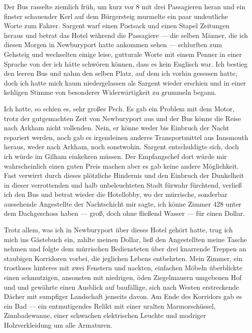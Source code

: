 Der Bus rasselte ziemlich früh, um kurz vor 8 mit drei Passagieren heran und ein finster schauender Kerl auf dem Bürgersteig murmelte ein paar undeutliche Worte zum Fahrer. Sargent warf einen Postsack und einen Stapel Zeitungen heraus und betrat das Hotel während die Passagiere --- die selben Männer, die ich diesen Morgen in Newburyport hatte ankommen sehen --- schlurften zum Gehsteig und wechselten einige leise, gutturale Worte mit einem Penner in einer Sprache von der ich hätte schwören können, dass es kein Englisch war. Ich bestieg den leeren Bus und nahm den selben Platz, auf dem ich vorhin gesessen hatte, doch ich hatte mich kaum niedergelassen als Sargent wieder erschien und in einer kehligen Stimme von besonderer Widerwärtigkeit zu grummeln begann.

Ich hatte, so schien es, sehr großes Pech. Es gab ein Problem mit dem Motor, trotz der gutgemachten Zeit von Newburyport aus und der Bus könne die Reise nach Arkham nicht vollenden. Nein, er könne weder bis Einbruch der Nacht repariert werden, noch gab es irgendeinen anderes Transportmittel aus Innsmouth heraus, weder nach Arkham, noch sonstwohin. Sargent entschuldigte sich, doch ich würde im Gilham einkehren müssen. Der Empfangschef dort würde mir wahrscheinlich einen guten Preis machen aber es gab keine andere Möglichkeit. Fast verwirrt durch dieses plötzliche Hindernis und den Einbruch der Dunkelheit in dieser verrottenden und halb unbeleuchteten Stadt fürwahr fürchtend, verließ ich den Bus und betrat wieder die Hotellobby, wo der mürrische, sonderbar aussehende Angestellte der Nachtschicht mir sagte, ich könne Zimmer 428 unter dem Dachgeschoss haben --- groß, doch ohne fließend Wasser --- für einen Dollar.

Trotz allem, was ich in Newburyport über dieses Hotel gehört hatte, trug ich mich ins Gästebuch ein, zahlte meinen Dollar, ließ den Angestellten meine Tasche nehmen und folgte dem mürrischen Bediensteten über drei knarrende Treppen an staubigen Korridoren vorbei, die jeglichen Lebens entbehrten. Mein Zimmer, ein trostloses hinteres mit zwei Fenstern und nackten, einfachen Möbeln überblickte einen schmutzigen, ansonsten mit niedrigen, öden Ziegelmauern umgebenen Hof und und gewährte einen Ausblick auf baufällige, sich nach Westen erstreckende Dächer mit sumpfiger Landschaft jenseits davon. Am Ende des Korridors gab es ein Bad --- ein entmutigendes Relikt mit einer uralten Marmorschüssel, Zinnbadewanne, einer schwachen elektrischen Leuchte und modriger Holzverkleidung um alle Armaturen.

